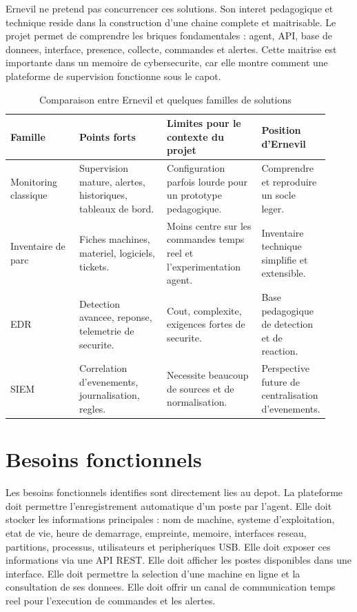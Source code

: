 \documentclass[12pt,a4paper]{report}
\begin{document}
Ernevil ne pretend pas concurrencer ces solutions. Son interet pedagogique et technique reside dans la construction d'une chaine complete et maitrisable. Le projet permet de comprendre les briques fondamentales : agent, API, base de donnees, interface, presence, collecte, commandes et alertes. Cette maitrise est importante dans un memoire de cybersecurite, car elle montre comment une plateforme de supervision fonctionne sous le capot.

\begin{longtable}{p{0.22\linewidth}p{0.28\linewidth}p{0.30\linewidth}p{0.12\linewidth}}
\caption{Comparaison entre Ernevil et quelques familles de solutions}\\
\toprule
\textbf{Famille} & \textbf{Points forts} & \textbf{Limites pour le contexte du projet} & \textbf{Position d'Ernevil}\\
\midrule
Monitoring classique & Supervision mature, alertes, historiques, tableaux de bord. & Configuration parfois lourde pour un prototype pedagogique. & Comprendre et reproduire un socle leger.\\
Inventaire de parc & Fiches machines, materiel, logiciels, tickets. & Moins centre sur les commandes temps reel et l'experimentation agent. & Inventaire technique simplifie et extensible.\\
EDR & Detection avancee, reponse, telemetrie de securite. & Cout, complexite, exigences fortes de securite. & Base pedagogique de detection et de reaction.\\
SIEM & Correlation d'evenements, journalisation, regles. & Necessite beaucoup de sources et de normalisation. & Perspective future de centralisation d'evenements.\\
\bottomrule
\end{longtable}

\section{Besoins fonctionnels}
Les besoins fonctionnels identifies sont directement lies au depot. La plateforme doit permettre l'enregistrement automatique d'un poste par l'agent. Elle doit stocker les informations principales : nom de machine, systeme d'exploitation, etat de vie, heure de demarrage, empreinte, memoire, interfaces reseau, partitions, processus, utilisateurs et peripheriques USB. Elle doit exposer ces informations via une API REST. Elle doit afficher les postes disponibles dans une interface. Elle doit permettre la selection d'une machine en ligne et la consultation de ses donnees. Elle doit offrir un canal de communication temps reel pour l'execution de commandes et les alertes.
\end{document}
